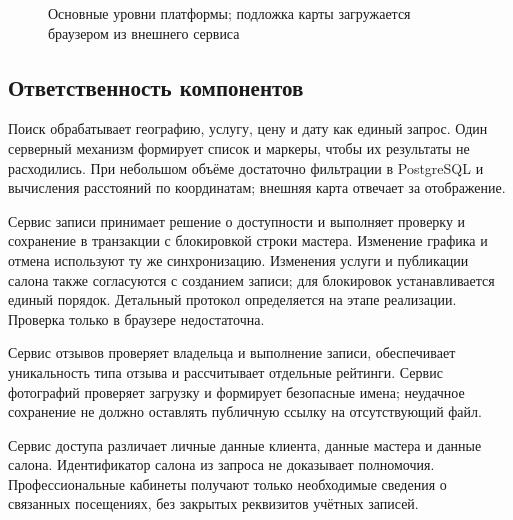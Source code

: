 \begin{figure}[htbp]
\centering
{}
\caption{Основные уровни платформы; подложка карты загружается браузером из внешнего сервиса}
\end{figure}

\subsection{Ответственность компонентов}
Поиск обрабатывает географию, услугу, цену и дату как единый запрос. Один серверный механизм формирует список и маркеры, чтобы их результаты не расходились. При небольшом объёме достаточно фильтрации в PostgreSQL и вычисления расстояний по координатам; внешняя карта отвечает за отображение.

Сервис записи принимает решение о доступности и выполняет проверку и сохранение в транзакции с блокировкой строки мастера. Изменение графика и отмена используют ту же синхронизацию. Изменения услуги и публикации салона также согласуются с созданием записи; для блокировок устанавливается единый порядок. Детальный протокол определяется на этапе реализации. Проверка только в браузере недостаточна.

Сервис отзывов проверяет владельца и выполнение записи, обеспечивает уникальность типа отзыва и рассчитывает отдельные рейтинги. Сервис фотографий проверяет загрузку и формирует безопасные имена; неудачное сохранение не должно оставлять публичную ссылку на отсутствующий файл.

Сервис доступа различает личные данные клиента, данные мастера и данные салона. Идентификатор салона из запроса не доказывает полномочия. Профессиональные кабинеты получают только необходимые сведения о связанных посещениях, без закрытых реквизитов учётных записей.

